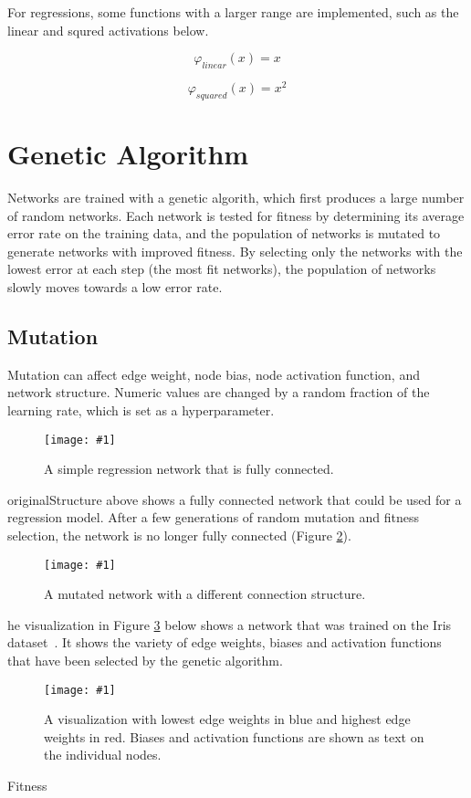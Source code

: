 \documentclass[twocolumn]{article}
\newcommand\fig[5]{
	\begin{figure}[H]
		\begin{center}\texttt{[image: \#1]}\end{center}
		\caption{#4}\label{fig:#2}
	\end{figure}
}
\newcommand\figRef[1]{Figure \ref{fig:#1}\xspace}
\begin{document}
For regressions, some functions with a larger range are implemented, such as the linear and squred activations below.

$$\varphi_{linear}(x) = x$$

$$\varphi_{squared}(x) = x^2$$

\section{Genetic Algorithm}
Networks are trained with a genetic algorith, which first produces a large number of random networks. Each network is tested for fitness by determining its average error rate on the training data, and the population of networks is mutated to generate networks with improved fitness. By selecting only the networks with the lowest error at each step (the most fit networks), the population of networks slowly moves towards a low error rate.

\subsection{Mutation}

Mutation can affect edge weight, node bias, node activation function, and network structure. Numeric values are changed by a random fraction of the learning rate, which is set as a hyperparameter. 

\fig{images/originalRegression.png}{originalStructure}{0.2}{
A simple regression network that is fully connected.
}

\figRef{originalStructure} above shows a fully connected network that could be used for a regression model. After a few generations of random mutation and fitness selection, the network is no longer fully connected (\figRef{mutatedStructure}).

\fig{images/mutatedRegression.png}{mutatedStructure}{0.2}{
A mutated network with a different connection structure.
}

The visualization in \figRef{enhancedVis} below shows a network that was trained on the Iris dataset~\cite{IrisDataset}. It shows the variety of edge weights, biases and activation functions that have been selected by the genetic algorithm.

\fig{images/enhancedVisualization.png}{enhancedVis}{0.2}{
A visualization with lowest edge weights in blue and highest edge weights in red. Biases and activation functions are shown as text on the individual nodes. 
}

\subsection{Fitness}
\end{document}
